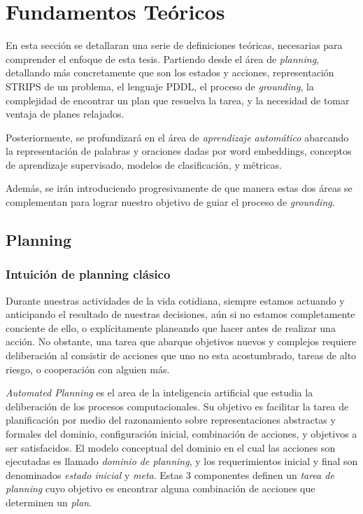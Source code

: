 \chapter{Fundamentos Teóricos}
\label{ch:lit_rev}

En esta sección se detallaran una serie de definiciones teóricas, necesarias
para comprender el enfoque de esta tesis. Partiendo desde el área de
\emph{planning}, detallando más concretamente que son los estados y acciones,
representación STRIPS de un problema, el lenguaje PDDL, el proceso de
\emph{grounding}, la complejidad de encontrar un plan que resuelva la tarea, y
la necesidad de tomar ventaja de planes relajados.

Posteriormente, se profundizará en el área de \emph{aprendizaje automático} abarcando
la representación de palabras y oraciones dadas por word embeddings, conceptos
de aprendizaje supervisado, modelos de clasificación, y métricas.

Además, se irán introduciendo progresivamente de que manera estas dos áreas
se complementan para lograr nuestro objetivo de guiar el proceso de
\emph{grounding}.

\section{Planning}

\subsection{Intuición de planning clásico}

Durante nuestras actividades de la vida cotidiana, siempre estamos actuando y
anticipando el resultado de nuestras decisiones, aún si no estamos completamente
conciente de ello, o explícitamente planeando que hacer antes de realizar una
acción. No obstante, una tarea que abarque objetivos nuevos y complejos requiere
deliberación al consistir de acciones que uno no esta acostumbrado, tareas de
alto riesgo, o cooperación con alguien más.

\emph{Automated Planning} es el area de la inteligencia artificial que estudia
la deliberación de los procesos computacionales. Su objetivo es facilitar la
tarea de planificación por medio del razonamiento sobre representaciones
abstractas y formales del dominio, configuración inicial, combinación de
acciones, y objetivos a ser satisfacidos. El modelo conceptual del dominio en el
cual las acciones son ejecutadas es llamado \emph{dominio de planning}, y los
requerimientos inicial y final son denominados \emph{estado inicial} y
\emph{meta}. Estas 3 componentes definen un \emph{tarea de planning} cuyo
objetivo es encontrar alguna combinación de acciones que determinen un
\emph{plan}.

